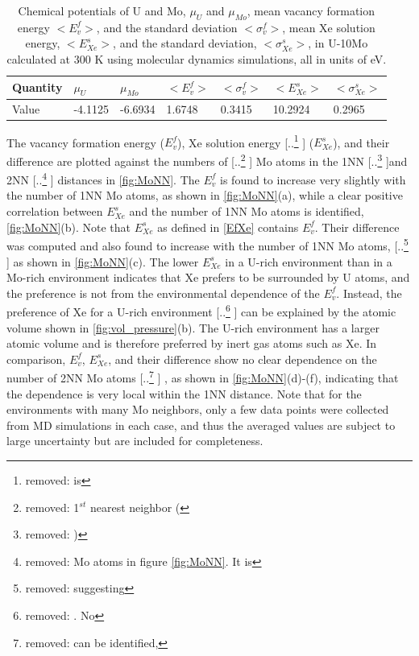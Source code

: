 \documentclass[review]{elsarticle}
\providecommand{\DIFaddtex}[1]{{\protect\color{blue} \sf #1}} %
\providecommand{\DIFdeltex}[1]{{\protect\color{red} [..\footnote{removed: #1} ]}} %
\providecommand{\DIFaddbegin}{} %
\providecommand{\DIFaddend}{} %
\providecommand{\DIFdelbegin}{} %
\providecommand{\DIFdelend}{} %
\providecommand{\DIFadd}[1]{\texorpdfstring{\DIFaddtex{#1}}{#1}} %
\providecommand{\DIFdel}[1]{\texorpdfstring{\DIFdeltex{#1}}{}} %
\newcommand{\DIFscaledelfig}{0.5}
\newlength{\DIFdelgraphicswidth} %
\newlength{\DIFdelgraphicsheight} %
\newcommand{\DIFaddincludegraphics}[2][]{{\color{blue}\fbox{\DIFOincludegraphics[#1]{#2}}}} %
\newcommand{\DIFdelincludegraphics}[2][]{%
\sbox{\DIFdelgraphicsbox}{\DIFOincludegraphics[#1]{#2}}%
\settoboxwidth{\DIFdelgraphicswidth}{\DIFdelgraphicsbox} %
\settoboxtotalheight{\DIFdelgraphicsheight}{\DIFdelgraphicsbox} %
\scalebox{\DIFscaledelfig}{%
\parbox[b]{\DIFdelgraphicswidth}{\usebox{\DIFdelgraphicsbox}\\[-\baselineskip] \rule{\DIFdelgraphicswidth}{0em}}\llap{\resizebox{\DIFdelgraphicswidth}{\DIFdelgraphicsheight}{%
\setlength{\unitlength}{\DIFdelgraphicswidth}%
\begin{picture}(1,1)%
\thicklines\linethickness{2pt} %
{\color[rgb]{1,0,0}\put(0,0){\framebox(1,1){}}}%
{\color[rgb]{1,0,0}\put(0,0){\line( 1,1){1}}}%
{\color[rgb]{1,0,0}\put(0,1){\line(1,-1){1}}}%
\end{picture}%
}\hspace*{3pt}}} %
} %
\DeclareRobustCommand{\DIFaddbegin}{\DIFOaddbegin \let\includegraphics\DIFaddincludegraphics} %
\DeclareRobustCommand{\DIFaddend}{\DIFOaddend \let\includegraphics\DIFOincludegraphics} %
\DeclareRobustCommand{\DIFdelbegin}{\DIFOdelbegin \let\includegraphics\DIFdelincludegraphics} %
\DeclareRobustCommand{\DIFdelend}{\DIFOaddend \let\includegraphics\DIFOincludegraphics} %
\begin{document}
\begin{table}[h!]
\centering
\begin{tabular}{|l|l|l|l|l|l|l|}
\hline
Quantity & $\mu_U$ & $\mu_{Mo}$ & $<E^f_v>$      & $<\sigma^f_v>$      & $<E^s_{Xe}>$       & $<\sigma^s_{Xe}>$      \\ \hline
Value    & -4.1125 & -6.6934     & 1.6748         & 0.3415              & 10.2924           & 0.2965 \\ \hline
\end{tabular}
\caption{Chemical potentials of U and Mo, $\mu_U$ and $\mu_{Mo}$, mean vacancy formation energy $<E^f_v>$, and the standard deviation $<\sigma^f_v>$, mean Xe solution energy, $<E^s_{Xe}>$, and the standard deviation, $<\sigma^s_{Xe}>$, in U-10Mo calculated at 300 K using molecular dynamics simulations, all in units of eV.}\label{Table:EfV}
\end{table}

The \DIFaddbegin \DIFadd{vacancy formation energy ($E^f_v$), }\DIFaddend Xe solution energy \DIFdelbegin \DIFdel{is }\DIFdelend \DIFaddbegin \DIFadd{($E^s_{Xe}$), and their difference are }\DIFaddend plotted against the numbers of \DIFdelbegin \DIFdel{1$^{st}$ nearest neighbor (}\DIFdelend \DIFaddbegin \DIFadd{Mo atoms in the }\DIFaddend 1NN \DIFdelbegin \DIFdel{) }\DIFdelend and 2NN \DIFdelbegin \DIFdel{Mo atoms in figure \ref{fig:MoNN}. It is }\DIFdelend \DIFaddbegin \DIFadd{distances in \cref{fig:MoNN}. The $E^f_v$ is found to increase very slightly with the number of 1NN Mo atoms, as shown in \cref{fig:MoNN}(a), while a clear positive correlation between $E^s_{Xe}$ and the number of 1NN Mo atoms is identified, \cref{fig:MoNN}(b). Note that $E^s_{Xe}$ as defined in \cref{EfXe} contains $E^f_{v}$. Their difference was computed and also }\DIFaddend found to increase with the number \DIFaddbegin \DIFadd{of }\DIFaddend 1NN Mo atoms, \DIFdelbegin \DIFdel{suggesting }\DIFdelend \DIFaddbegin \DIFadd{as shown in \cref{fig:MoNN}(c). The lower $E^s_{Xe}$ in a U-rich environment than in a Mo-rich environment indicates }\DIFaddend that Xe prefers \DIFaddbegin \DIFadd{to be surrounded by U atoms, and the preference is not from the environmental dependence of the $E^f_{v}$. Instead, the preference of Xe for }\DIFaddend a U-rich environment \DIFdelbegin \DIFdel{. No }\DIFdelend \DIFaddbegin \DIFadd{can be explained by the atomic volume shown in \cref{fig:vol_pressure}(b). The U-rich environment has a larger atomic volume and is therefore preferred by inert gas atoms such as Xe. In comparison, $E^f_{v}$, $E^s_{Xe}$, and their difference show no }\DIFaddend clear dependence on the number of 2NN Mo atoms\DIFdelbegin \DIFdel{can be identified, }\DIFdelend \DIFaddbegin \DIFadd{, as shown in \cref{fig:MoNN}(d)-(f), }\DIFaddend indicating that the dependence is very local within the 1NN distance. \DIFaddbegin \DIFadd{Note that for the environments with many Mo neighbors, only a few data points were collected from MD simulations in each case, and thus the averaged values are subject to large uncertainty but are included for completeness.
}\DIFaddend 
\end{document}

